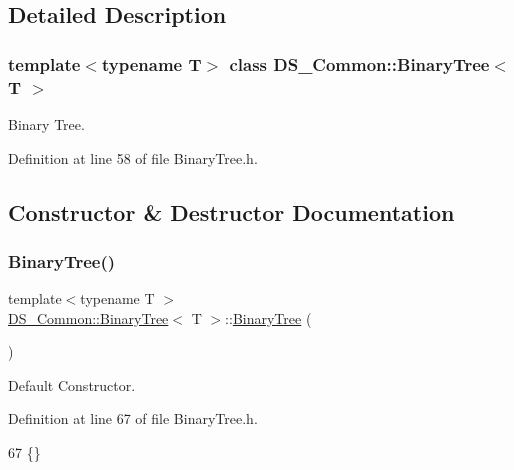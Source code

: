 \subsection{Detailed Description}
\subsubsection*{template$<$typename T$>$\newline
class D\+S\+\_\+\+Common\+::\+Binary\+Tree$<$ T $>$}

Binary Tree. 

Definition at line 58 of file Binary\+Tree.\+h.



\subsection{Constructor \& Destructor Documentation}
\mbox{\label{class_d_s___common_1_1_binary_tree_a12febe864bcdd97421d884a0cdd84ba0}} 
\subsubsection{\texorpdfstring{Binary\+Tree()}{BinaryTree()}\hspace{0.1cm}{\footnotesize\ttfamily [1/2]}}
{\footnotesize\ttfamily template$<$typename T $>$ \\
\mbox{\hyperlink{class_d_s___common_1_1_binary_tree}{D\+S\+\_\+\+Common\+::\+Binary\+Tree}}$<$ T $>$\+::\mbox{\hyperlink{class_d_s___common_1_1_binary_tree}{Binary\+Tree}} (\begin{DoxyParamCaption}{ }\end{DoxyParamCaption})\hspace{0.3cm}{\ttfamily [inline]}}



Default Constructor. 



Definition at line 67 of file Binary\+Tree.\+h.


\begin{DoxyCode}
67 \{\}
\end{DoxyCode}
\mbox{\label{class_d_s___common_1_1_binary_tree_aabe4c48985d51037acfd37b5752671bd}} 
